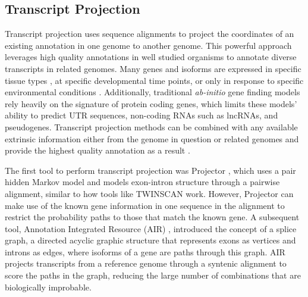 \documentclass[fleqn,10pt]{wlscirep}
\begin{document}
\subsection{Transcript Projection}

Transcript projection uses sequence alignments to project the coordinates of an existing annotation in one genome to another genome. This powerful approach leverages high quality annotations in well studied organisms to annotate diverse transcripts in related genomes. Many genes and isoforms are expressed in specific tissue types \cite{gtex2015genotype}, at specific developmental time points, or only in response to specific environmental conditions \cite{peng2011integrative}.
Additionally, traditional \textit{ab-initio} gene finding models rely heavily on the signature of protein coding genes, which limits these models' ability to predict UTR sequences, non-coding RNAs such as lncRNAs, and pseudogenes. Transcript projection methods can be combined with any available extrinsic information either from the genome in question or related genomes and provide the highest quality annotation as a result \cite{stanke2008using}.

The first tool to perform transcript projection was Projector \cite{meyer2004gene}, which uses a pair hidden Markov model and models exon-intron structure through a pairwise alignment, similar to how tools like TWINSCAN work. However, Projector can make use of the known gene information in one sequence in the alignment to restrict the probability paths to those that match the known gene. A subsequent tool, Annotation Integrated Resource (AIR) \cite{florea2005gene}, introduced the concept of a splice graph, a directed acyclic graphic structure that represents exons as vertices and introns as edges, where isoforms of a gene are paths through this graph. AIR projects transcripts from a reference genome through a syntenic alignment to score the paths in the graph, reducing the large number of combinations that are biologically improbable. 
\end{document}
